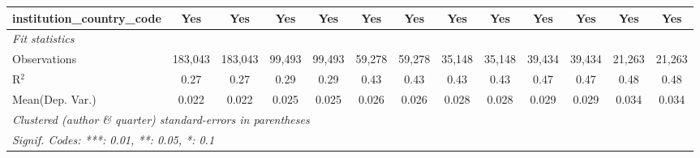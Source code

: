 \begin{tabular}{lcccccccccccc}
   institution\_country\_code               & Yes            & Yes            & Yes            & Yes            & Yes           & Yes           & Yes           & Yes           & Yes           & Yes            & Yes           & Yes\\  
   \midrule
   \emph{Fit statistics}\\
   Observations                             & 183,043        & 183,043        & 99,493         & 99,493         & 59,278        & 59,278        & 35,148        & 35,148        & 39,434        & 39,434         & 21,263        & 21,263\\  
   R$^2$                                    & 0.27           & 0.27           & 0.29           & 0.29           & 0.43          & 0.43          & 0.43          & 0.43          & 0.47          & 0.47           & 0.48          & 0.48\\  
Mean(Dep. Var.) & 0.022 & 0.022 & 0.025 & 0.025 & 0.026 & 0.026 & 0.028 & 0.028 & 0.029 & 0.029 & 0.034 & 0.034 \\
   \midrule \midrule
   \multicolumn{13}{l}{\emph{Clustered (author \& quarter) standard-errors in parentheses}}\\
   \multicolumn{13}{l}{\emph{Signif. Codes: ***: 0.01, **: 0.05, *: 0.1}}\\
\end{tabular}
\par\endgroup
